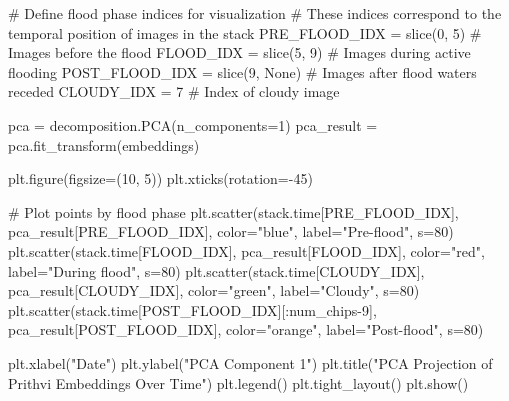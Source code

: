 \documentclass[
  letterpaper,
  DIV=11,
  numbers=noendperiod]{scrreprt}
\newenvironment{Shaded}{\begin{snugshade}}{\end{snugshade}}
\newcommand{\BuiltInTok}[1]{\textcolor[rgb]{0.00,0.23,0.31}{#1}}
\newcommand{\CommentTok}[1]{\textcolor[rgb]{0.37,0.37,0.37}{#1}}
\newcommand{\DecValTok}[1]{\textcolor[rgb]{0.68,0.00,0.00}{#1}}
\newcommand{\NormalTok}[1]{\textcolor[rgb]{0.00,0.23,0.31}{#1}}
\newcommand{\OperatorTok}[1]{\textcolor[rgb]{0.37,0.37,0.37}{#1}}
\newcommand{\StringTok}[1]{\textcolor[rgb]{0.13,0.47,0.30}{#1}}
\newcommand{\VariableTok}[1]{\textcolor[rgb]{0.07,0.07,0.07}{#1}}
\begin{document}
\begin{Shaded}
\begin{Highlighting}[]
\CommentTok{\# Define flood phase indices for visualization}
\CommentTok{\# These indices correspond to the temporal position of images in the stack}
\NormalTok{PRE\_FLOOD\_IDX }\OperatorTok{=} \BuiltInTok{slice}\NormalTok{(}\DecValTok{0}\NormalTok{, }\DecValTok{5}\NormalTok{)      }\CommentTok{\# Images before the flood}
\NormalTok{FLOOD\_IDX }\OperatorTok{=} \BuiltInTok{slice}\NormalTok{(}\DecValTok{5}\NormalTok{, }\DecValTok{9}\NormalTok{)          }\CommentTok{\# Images during active flooding}
\NormalTok{POST\_FLOOD\_IDX }\OperatorTok{=} \BuiltInTok{slice}\NormalTok{(}\DecValTok{9}\NormalTok{, }\VariableTok{None}\NormalTok{)  }\CommentTok{\# Images after flood waters receded}
\NormalTok{CLOUDY\_IDX }\OperatorTok{=} \DecValTok{7}                   \CommentTok{\# Index of cloudy image}

\NormalTok{pca }\OperatorTok{=}\NormalTok{ decomposition.PCA(n\_components}\OperatorTok{=}\DecValTok{1}\NormalTok{)}
\NormalTok{pca\_result }\OperatorTok{=}\NormalTok{ pca.fit\_transform(embeddings)}

\NormalTok{plt.figure(figsize}\OperatorTok{=}\NormalTok{(}\DecValTok{10}\NormalTok{, }\DecValTok{5}\NormalTok{))}
\NormalTok{plt.xticks(rotation}\OperatorTok{={-}}\DecValTok{45}\NormalTok{)}

\CommentTok{\# Plot points by flood phase}
\NormalTok{plt.scatter(stack.time[PRE\_FLOOD\_IDX], pca\_result[PRE\_FLOOD\_IDX], color}\OperatorTok{=}\StringTok{"blue"}\NormalTok{, label}\OperatorTok{=}\StringTok{"Pre{-}flood"}\NormalTok{, s}\OperatorTok{=}\DecValTok{80}\NormalTok{)}
\NormalTok{plt.scatter(stack.time[FLOOD\_IDX], pca\_result[FLOOD\_IDX], color}\OperatorTok{=}\StringTok{"red"}\NormalTok{, label}\OperatorTok{=}\StringTok{"During flood"}\NormalTok{, s}\OperatorTok{=}\DecValTok{80}\NormalTok{)}
\NormalTok{plt.scatter(stack.time[CLOUDY\_IDX], pca\_result[CLOUDY\_IDX], color}\OperatorTok{=}\StringTok{"green"}\NormalTok{, label}\OperatorTok{=}\StringTok{"Cloudy"}\NormalTok{, s}\OperatorTok{=}\DecValTok{80}\NormalTok{)}
\NormalTok{plt.scatter(stack.time[POST\_FLOOD\_IDX][:num\_chips}\OperatorTok{{-}}\DecValTok{9}\NormalTok{], pca\_result[POST\_FLOOD\_IDX], color}\OperatorTok{=}\StringTok{"orange"}\NormalTok{, label}\OperatorTok{=}\StringTok{"Post{-}flood"}\NormalTok{, s}\OperatorTok{=}\DecValTok{80}\NormalTok{)}

\NormalTok{plt.xlabel(}\StringTok{"Date"}\NormalTok{)}
\NormalTok{plt.ylabel(}\StringTok{"PCA Component 1"}\NormalTok{)}
\NormalTok{plt.title(}\StringTok{"PCA Projection of Prithvi Embeddings Over Time"}\NormalTok{)}
\NormalTok{plt.legend()}
\NormalTok{plt.tight\_layout()}
\NormalTok{plt.show()}
\end{Highlighting}
\end{Shaded}
\end{document}
